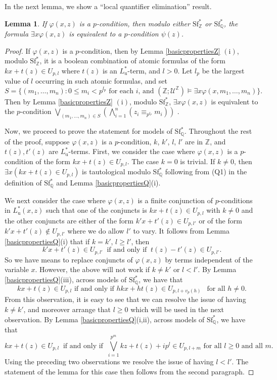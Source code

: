\documentclass[letterpaper]{amsart}
\newcommand{\qq}{\mathbb{Q}}
\newcommand{\zz}{\mathbb{Z}}
\newcommand{\sU}{\mathscr{U}}
\newcommand{\WSFZ}{\mathrm{Sf}^*_{\zz}}
\newcommand{\WSFQ}{\mathrm{Sf}^*_{\qq}}
\newtheorem{lem}[thm]{Lemma}
\begin{document}
\noindent In the next lemma, we show a ``local quantifier elimination'' result.
\begin{lem} \label{localQE}
If $\varphi(x,z)$ is a $p$-condition, then modulo either $\WSFZ$ or $\WSFQ$, the formula  $\exists x \varphi(x,z)$ is equivalent to a $p$-condition $\psi(z)$.
\end{lem}
\begin{proof}
If $\varphi(x,z)$ is a $p$-condition, then by Lemma \ref{basicpropertiesZ} $(\mathrm{i})$, modulo $\WSFZ$, it is a boolean combination of atomic formulas of the form $kx +t(z) \in U_{p, l}$ where $t(z)$ is an $L^*_{\mathrm{u}}$-term, and $l>0$. Let $l_p$ be the largest value of $l$ occurring in such atomic formulas, and set $$S=\{(m_1,\ldots,m_n): 0 \leq m_i < p^{l_p} \text{ for each $i$, and } (\zz; \sU^\zz) \models \exists x \varphi(x,m_1,\ldots,m_n)\}.$$ Then by Lemma \ref{basicpropertiesZ} $(\mathrm{i})$, modulo $\WSFZ$, $\exists x \varphi(x,z)$ is equivalent to the $p$-condition $\bigvee_{(m_1,\ldots,m_n)\in S} (\bigwedge_{i=1}^{n} (z_i\equiv_{p^{l_p}} m_i))$ .

Now, we proceed to prove the statement for models of $\WSFQ$. Throughout the rest of the  proof, suppose $\varphi(x,z)$ is a $p$-condition, $k$, $k'$, $l$, $l'$ are in $\zz$, and $t(z), t'(z)$ are $L_{\mathrm{u}}^*$-terms. First, we consider the case where $\varphi(x,z)$ is a  $p$-condition of the form 
$kx+t(z) \in U_{p,l}$. 
The case $k=0$ is trivial.  If $k \neq 0$, then $\exists x (kx+t(z) \in U_{p,l})$ is tautological modulo $\WSFQ$ following from (Q1) in the definition of $\WSFQ$ and Lemma \ref{basicpropertiesQ}(i).


We next consider the case where $\varphi(x,z)$ is a finite  conjunction of $p$-conditions in $L^*_{\mathrm{u}}(x, z)$ such that one of the conjuncts is $kx+t(z) \in U_{p,l}$ with $k \neq 0$ and the other conjuncts are either of the form $k'x+t'(z) \in U_{p,l'}$ or of the form $k'x+t'(z) \notin U_{p,l'}$ where we do allow $l'$ to vary.  It follows from Lemma \ref{basicpropertiesQ}(i) that if $k = k'$, $l\geq l'$, then
$$  k'x + t'(z)\in U_{p, l'}  \ \text{ if and only if } \  t(z)-t'(z) \in U_{p, l'}. $$
So we have means to replace conjuncts of $\varphi(x,z)$ by  terms independent of the variable $x$. However, the above will not work if $k \neq k'$ or $l<l'$. By Lemma \ref{basicpropertiesQ}(iii), across models of $\WSFQ$,  we have that 
$$kx+ t(z) \in U_{p, l} \text{ if and only if } hkx + ht(z) \in U_{p, l+ v_p(h)} \ \ \text{ for all } h \neq 0.$$
From this observation, it is easy to see that we can resolve the issue of having $k \neq k'$, and moreover arrange that $l\geq 0$ which will be used in the next observation.
By Lemma \ref{basicpropertiesQ}(i,ii), across models of $\WSFQ$,  we have that 
$$  kx + t(z) \in U_{p, l}  \ \text{ if and only if } \ \bigvee_{i=1}^{p^m} kz + t(z) + ip^{l}  \in U_{p, l+m} \text{ for all } l\geq 0 \text{ and all } m. $$
Using the preceding two observations we resolve the issue of having $l<l'$. The statement of the lemma for this case then follows from the second paragraph.


\end{proof}
\end{document}
